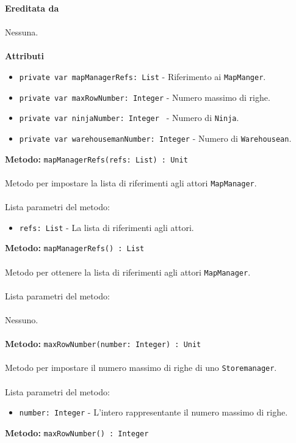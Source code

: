 \documentclass[a4paper]{article}
\begin{document}
		\textbf{Ereditata da}
			\\ \\
			Nessuna.
			\\ \\
		\textbf{Attributi}
			\begin{itemize}
				\item \texttt{private var mapManagerRefs: List} - Riferimento ai \texttt{MapManger}.
				\item \texttt{private var maxRowNumber: Integer} - Numero massimo di righe.
				\item \texttt{private var ninjaNumber: Integer } - Numero di \texttt{Ninja}.
				\item \texttt{private var warehousemanNumber: Integer} - Numero di \texttt{Warehousean}.
			\end{itemize}
		\textbf{Metodo:} \texttt{mapManagerRefs(refs: List) : Unit}
		\\ \\
		Metodo per impostare la lista di riferimenti agli attori \texttt{MapManager}.
		\\ \\
		Lista parametri del metodo:
		\begin{itemize}
			\item \texttt{refs: List} - La lista di riferimenti agli attori.
		\end{itemize}
		\textbf{Metodo:} \texttt{mapManagerRefs() : List}
		\\ \\
		Metodo per ottenere la lista di riferimenti agli attori \texttt{MapManager}.
		\\ \\
		Lista parametri del metodo:
		\\ \\
		Nessuno.
		\\ \\
		\textbf{Metodo:} \texttt{maxRowNumber(number: Integer) : Unit}
		\\ \\
		Metodo per impostare il numero massimo di righe di uno \texttt{Storemanager}.
		\\ \\
		Lista parametri del metodo:
		\begin{itemize}
			\item \texttt{number: Integer} - L'intero rappresentante il numero massimo di righe.
		\end{itemize}
		\textbf{Metodo:} \texttt{maxRowNumber() : Integer}
		\\ \\
\end{document}
